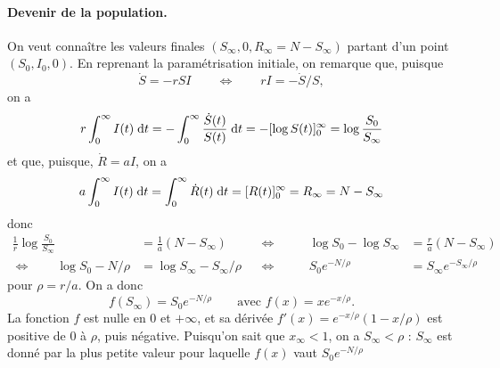 \paragraph*{Devenir de la population.}
On veut connaître les valeurs finales $(S_\infty, 0, R_\infty = N - S_\infty)$ partant d'un point $(S_0, I_0, 0)$. En reprenant la paramétrisation initiale, on remarque que, puisque
$$
\dot S = - r S I \qquad \Leftrightarrow \qquad r I = - \dot S / S,
$$
on a
$$
r \int_0^\infty I(t) \; \text{d} t
= - \int_0^\infty \frac{\dot S(t)}{S(t)} \; \text{d} t
= - [\log S(t)]_0^\infty
= \log \frac{S_0}{S_\infty}
$$
et que, puisque, $\dot R = aI$, on a
$$
a \int_0^\infty I(t) \; \text{d} t
= \int_0^\infty \dot R(t) \; \text{d} t
= [R(t)]_0^\infty
= R_\infty = N - S_\infty
$$
donc
\begin{align*}
  \frac1r \log \frac{S_0}{S_\infty} & = \frac1a (N - S_\infty) & 
  & \Leftrightarrow \qquad & 
  \log {S_0} - \log {S_\infty} & = \frac{r}a (N - S_\infty) \\
  \Leftrightarrow \qquad
  \log S_0  - N / \rho & = \log S_\infty - S_\infty / \rho &
  & \Leftrightarrow \qquad &
  S_0 e^{- N / \rho}& = S_\infty e^{- S_\infty/\rho} 
\end{align*}
pour $\rho = r/a$. On a donc
$$
f(S_\infty) = S_0 e^{- N / \rho}
\qquad \text{avec } f(x) = x e^{-x/\rho}.
$$
La fonction $f$ est nulle en 0 et $+\infty$, et sa dérivée $f'(x) = e^{-x/\rho}(1 - x/\rho)$ est positive de 0 à $\rho$, puis négative.
Puisqu'on sait que $x_\infty  < 1$, on a $S_\infty < \rho$ : $S_\infty$ est donné par la plus petite valeur pour laquelle $f(x)$ vaut $S_0 e^{- N / \rho}$
